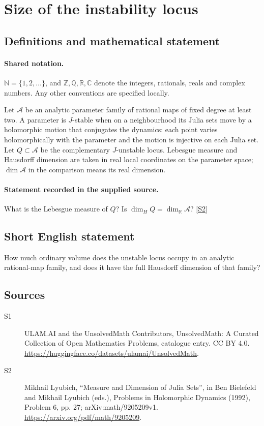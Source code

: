 \documentclass[11pt]{article}
\newcommand{\sref}[2]{\hyperlink{source:#1:#2}{[S#2]}}
\begin{document}
\section{Size of the instability locus}\label{statement}

\subsection{Definitions and mathematical statement}

\paragraph{Shared notation.}$\mathbb N=\{1,2,\ldots\}$, and $\mathbb Z,\mathbb Q,\mathbb R,\mathbb C$ denote the integers, rationals, reals and complex numbers. Any other conventions are specified locally.


Let $\mathcal A$ be an analytic parameter family of rational maps of fixed degree at least two. A parameter is $J$-stable when on a neighbourhood its Julia sets move by a holomorphic motion that conjugates the dynamics: each point varies holomorphically with the parameter and the motion is injective on each Julia set. Let $Q\subset\mathcal A$ be the complementary $J$-unstable locus. Lebesgue measure and Hausdorff dimension are taken in real local coordinates on the parameter space; $\dim\mathcal A$ in the comparison means its real dimension.
\paragraph{Statement recorded in the supplied source.}
What is the Lebesgue measure of $Q$? Is $\dim_HQ=\dim_{\mathbb R}\mathcal A$? \sref{statement}{2}
\subsection{Short English statement}
How much ordinary volume does the unstable locus occupy in an analytic rational-map family, and does it have the full Hausdorff dimension of that family?
\subsection{Sources}
\begin{description}
\item[\hypertarget{source:statement:1}{S1}] ULAM.AI and the UnsolvedMath Contributors, UnsolvedMath: A Curated Collection of Open Mathematics Problems, catalogue entry. CC BY 4.0. \url{https://huggingface.co/datasets/ulamai/UnsolvedMath}.
\item[\hypertarget{source:statement:2}{S2}] Mikhail Lyubich, ``Measure and Dimension of Julia Sets'', in Ben Bielefeld and Mikhail Lyubich (eds.), Problems in Holomorphic Dynamics (1992), Problem 6, pp. 27; arXiv:math/9205209v1. \url{https://arxiv.org/pdf/math/9205209}.
\end{description}
\label{end:statement}
\end{document}
